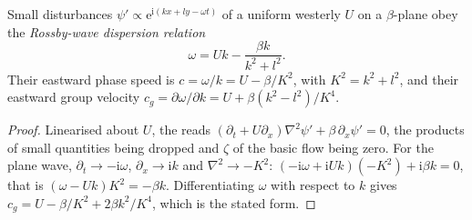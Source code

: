 \begin{theorem}\label{thm:b3:atmospheric-dynamics:rossby}
Small disturbances $\psi' \propto \mathrm e^{\mathrm i(kx + ly - \omega t)}$
of a uniform westerly $U$ on a $\beta$-plane obey the
\emph{Rossby-wave dispersion relation}
\[
\omega = Uk - \frac{\beta k}{k^2 + l^2} .
\]
Their eastward phase speed is $c = \omega/k = U - \beta/K^2$, with $K^2 =
k^2 + l^2$, and their eastward group velocity $c_g = \partial\omega/\partial
k = U + \beta(k^2 - l^2)/K^4$.
\end{theorem}

\begin{proof}
Linearised about $U$, the  reads
$(\partial_t + U\partial_x)\nabla^2\psi' + \beta\,\partial_x\psi' = 0$, the
products of small quantities being dropped and $\zeta$ of the basic flow
being zero. For the plane wave, $\partial_t \to -\mathrm i\omega$,
$\partial_x \to \mathrm ik$ and $\nabla^2 \to -K^2$: $(-\mathrm i\omega +
\mathrm iUk)(-K^2) + \mathrm i\beta k = 0$, that is $(\omega - Uk)K^2 =
-\beta k$. Differentiating $\omega$ with respect to $k$ gives $c_g = U -
\beta/K^2 + 2\beta k^2/K^4$, which is the stated form.
\end{proof}

